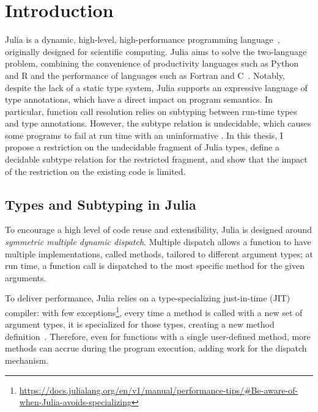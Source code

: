 \chapter{Introduction}

Julia is a dynamic, high-level, high-performance programming
language~\cite{bib:bezanson:julia-fresh:2017},
originally designed for scientific computing.
Julia aims to solve the two-language problem, combining the convenience of
productivity languages such as Python and R and the performance of languages
such as Fortran and C~\cite{bib:bezanson:julia-dyn-perf:oopsla:2018}.
Notably, despite the lack of a static type system,
Julia supports an expressive language of type annotations, which have a direct 
impact on program semantics. In particular, function call resolution relies on 
subtyping between run-time types and type annotations.
However, the subtype relation is undecidable, which causes some programs to
fail at run time with an uninformative .
In this thesis, I propose a restriction on the undecidable fragment of
Julia types, define a decidable subtype relation for the restricted fragment,
and show that the impact of the restriction on the existing code is limited.


\section{Types and Subtyping in Julia}

To encourage a high level of code reuse and extensibility,
Julia is designed around \emph{symmetric multiple dynamic dispatch}.
Multiple dispatch allows a function to have multiple implementations, called
methods, tailored to different argument types; at run time, a function
call is dispatched to the most specific method for the given arguments.

To deliver performance, Julia relies on a type-specializing just-in-time (JIT)
compiler: with few exceptions\footnote{%
\url{https://docs.julialang.org/en/v1/manual/performance-tips/\#Be-aware-of-when-Julia-avoids-specializing}
}, %
every time a method is called with a new set of argument types,
it is specialized for those types, creating a new method
definition~\cite{bib:pelenitsyn:type-stability:oopsla:2021}.
Therefore, even for functions with a single user-defined method,
more methods can accrue during the program execution,
adding work for the dispatch mechanism.

